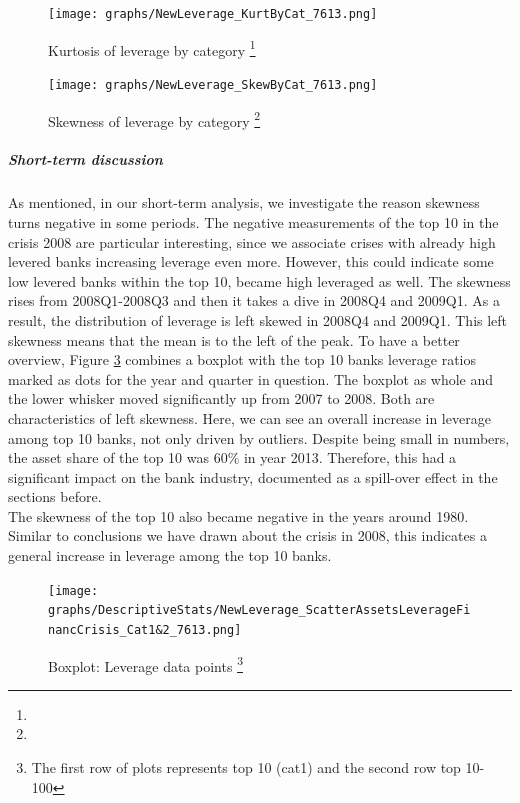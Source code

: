 \documentclass[12pt, a4paper]{article} %
\begin{document}
\begin{figure}[H]
\begin{minipage}{\textwidth}
\centering
\caption[1]{Kurtosis of leverage by category \footnote{}}
\texttt{[image: graphs/NewLeverage\_KurtByCat\_7613.png]}
\label{fig:averageLeverage_kurt_Categories}
\end{minipage}
\end{figure}

\begin{figure}[H]
\begin{minipage}{\textwidth}
\centering
\caption[1]{Skewness of leverage by category \footnote{}}
\texttt{[image: graphs/NewLeverage\_SkewByCat\_7613.png]}
\label{fig:averageLeverage_skew_Categories}
\end{minipage}
\end{figure} 

\subparagraph{Short-term discussion} 

As mentioned, in our short-term analysis, we investigate the reason skewness turns negative in some periods. The negative measurements of the top 10 in the crisis 2008 are particular interesting, since we associate crises with already high levered banks increasing leverage even more. However, this could indicate some low levered banks within the top 10, became high leveraged as well.
The skewness rises from 2008Q1-2008Q3 and then it takes a dive in 2008Q4 and 2009Q1. As a result, the distribution of leverage is left skewed in 2008Q4 and 2009Q1. This left skewness means that the mean is to the left of the peak. To have a better overview, Figure \ref{fig:BoxplotLeverageDatapointsFinancCrisis} combines a boxplot with the top 10 banks leverage ratios marked as dots for the year and quarter in question. The boxplot as whole and the lower whisker moved significantly up from 2007 to 2008. Both are characteristics of left skewness. Here, we can see an overall increase in leverage among top 10 banks, not only driven by outliers. Despite being small in numbers, the asset share of the top 10 was $60\%$ in year 2013. Therefore, this had a significant impact on the bank industry, documented as a spill-over effect in the sections before.\\
The skewness of the top 10 also became negative in the years around 1980. Similar to conclusions we have drawn about the crisis in 2008, this indicates a general increase in leverage among the top 10 banks.  


\begin{figure}[H]
\begin{minipage}{\textwidth}
\centering
\caption[1]{Boxplot: Leverage data points \footnote{The first row of plots represents top 10 (cat1) and the second row top 10-100}}
\texttt{[image: graphs/DescriptiveStats/NewLeverage\_ScatterAssetsLeverageFinancCrisis\_Cat1\&2\_7613.png]}
\label{fig:BoxplotLeverageDatapointsFinancCrisis}
\end{minipage}
\end{figure}
\end{document}
